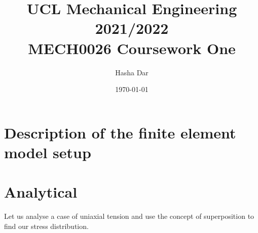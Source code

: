 \documentclass[11pt]{article}
\numberwithin{equation}{section}
\begin{document}
\title{\textbf{UCL Mechanical Engineering 2021/2022}\\MECH0026 Coursework One}
\author{Hasha Dar}
\date{\today}
\maketitle
\tableofcontents
\listoffigures
\section{Description of the finite element model setup}
\section{Analytical}
Let us analyse a case of uniaxial tension and use the concept of superposition to find our stress distribution.
\end{document}
